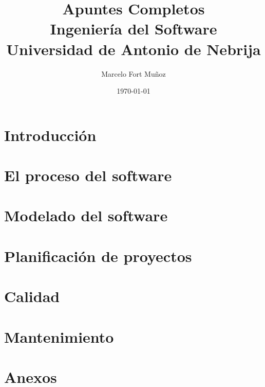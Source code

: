 \documentclass[a4paper,11pt]{report}
\title{Apuntes Completos \\ \large Ingeniería del Software \\ Universidad de Antonio de Nebrija}
\author{Marcelo Fort Muñoz}
\date{\today}
\begin{document}

    \maketitle
    \tableofcontents
    \newpage




    \chapter{Introducción}\label{ch:introduccion}
    


    \chapter{El proceso del software}\label{ch:el-proceso-del-software}
    


    \chapter{Modelado del software}\label{ch:modelado-del-software}
    

    \chapter{Planificación de proyectos}\label{ch:planificacion-de-proyectos}
    


    \chapter{Calidad}\label{ch:calidad}
    


    \chapter{Mantenimiento}\label{ch:mantenimiento}
    

    \chapter*{Anexos}
\end{document}
